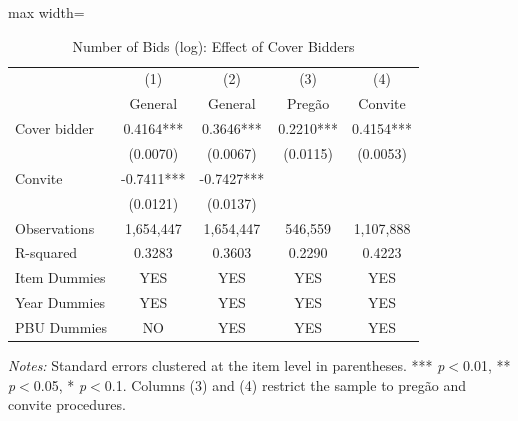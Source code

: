 \begin{table}[htbp]
\centering
\caption{Number of Bids (log): Effect of Cover Bidders}
\label{tab:nbids}
\begin{adjustbox}{max width=\textwidth}
\begin{threeparttable}
\small
\begin{tabular}{lcccc}
\toprule
 & (1) & (2) & (3) & (4) \\
 & General & General & Preg\~{a}o & Convite \\
\midrule
Cover bidder & 0.4164*** & 0.3646*** & 0.2210*** & 0.4154*** \\
 & (0.0070) & (0.0067) & (0.0115) & (0.0053) \\
Convite & -0.7411*** & -0.7427*** &  &  \\
 & (0.0121) & (0.0137) &  &  \\
\midrule
Observations & 1,654,447 & 1,654,447 & 546,559 & 1,107,888 \\
R-squared & 0.3283 & 0.3603 & 0.2290 & 0.4223 \\
Item Dummies & YES & YES & YES & YES \\
Year Dummies & YES & YES & YES & YES \\
PBU Dummies & NO & YES & YES & YES \\
\bottomrule
\end{tabular}
\begin{tablenotes}
\small
\item \textit{Notes:} Standard errors clustered at the item level in parentheses. *** \textit{p}$<$0.01, ** \textit{p}$<$0.05, * \textit{p}$<$0.1. Columns (3) and (4) restrict the sample to preg\~{a}o and convite procedures.
\end{tablenotes}
\end{threeparttable}
\end{adjustbox}
\end{table}
